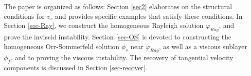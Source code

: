 \documentclass[reqno,11pt]{amsart}
\numberwithin{equation}{section}
\numberwithin{equation}{section}
\theoremstyle{plain}
\begin{document}
%
%


The paper is organized as follows: Section \ref{sec2} elaborates on the structural conditions for $v_s$ and provides specific examples that satisfy these conditions. In Section \ref{sec-Ray}, we construct the homogeneous Rayleigh solution $\varphi_{Ray}$, and prove the inviscid instability. Section \ref{sec-OS} is devoted to constructing the homogeneous Orr-Sommerfeld solution $\phi_s$ near $\varphi_{Ray}$, as well as a viscous sublayer $\phi_f$, and to proving the viscous instability.  The recovery of tangential velocity components is discussed in Section \ref{sec-recover}. \\
\end{document}
